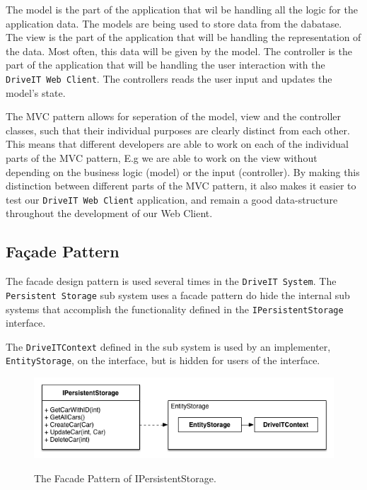 The model is the part of the application that wil be handling all the logic for the application data. The models are being used to store data from the dabatase.
The view is the part of the application that will be handling the representation of the data. Most often, this data will be given by the model.
The controller is the part of the application that will be handling the user interaction with the \texttt{DriveIT Web Client}. The controllers reads the user input and updates the model's state.

The MVC pattern allows for seperation of the model, view and the controller classes, such that their individual purposes are clearly distinct from each other. This means that different developers are able to work on each of the individual parts of the MVC pattern, E.g we are able to work on the view without depending on the business logic (model) or the input (controller). By making this distinction between different parts of the MVC pattern, it also makes it easier to test our \texttt{DriveIT Web Client} application, and remain a good data-structure throughout the development of our Web Client.


\subsection{Façade Pattern}
The facade design pattern is used several times in the \texttt{DriveIT System}.
The \texttt{Persistent Storage} sub system uses a facade pattern do hide the internal sub systems that accomplish the functionality defined in the \texttt{IPersistentStorage} interface.

The \texttt{DriveITContext} defined in the sub system is used by an implementer, \texttt{EntityStorage}, on the interface, but is hidden for users of the interface. 

\begin{figure}[H]
	\centering
	\includegraphics[scale=0.6]{Figures/FacadePatternPersistentStorage}\\
	\caption{The Facade Pattern of IPersistentStorage.}
	\label{fig:The Facade Pattern of IPersistentStorage.}
\end{figure}

